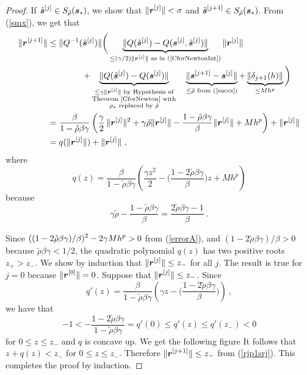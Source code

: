 \begin{proof}
 If $\displaystyle \tilde{\bm{s}}^{[j]} \in
S_{\tilde{\rho}}(\bm{s}_\ast)$, we show that
$\displaystyle \| \bm{r}^{[j]} \| < \sigma$ and
$\displaystyle \tilde{\bm{s}}^{[j+1]} \in S_{\tilde{\rho}}(\bm{s}_\ast)$.
From (\ref{smx}), we get that
\begin{align}
\| \bm{r}^{[j+1]} \| & \leq
\| Q^{-1}(\tilde{\bm{s}}^{[j]}) \|
\bigg( \underbrace{\| Q(\tilde{\bm{s}}^{[j]}) -
Q(\bm{s}^{[j]},\tilde{\bm{s}}^{[j]}) \|}_{\leq 
(\gamma/2) \| \bm{r}^{[j]}\| \text{ as in (\ref{CforNewtonInt})}}
\| \bm{r}^{[j]} \| \nonumber \\
& \qquad \qquad +
\underbrace{\| Q(\tilde{\bm{s}}^{[j]}) -Q(\bm{s}^{[j]}) \|}_{
\substack{\leq \gamma \| \bm{r}^{[j]}\| \text{ by Hypothesis of}\\
\text{Theorem~\ref{CforNewton} with}\\
\text{$\rho_\ast$ replaced by $\tilde{\rho}$}}}
\quad \underbrace{\| \bm{s}^{[j+1]} - \bm{s}^{[j]} \|}_{\leq
\tilde{\rho} \text{ from (\ref{succs})}}
+ \underbrace{\| \delta_{j+1}(h) \|}_{\leq Mh^p} \bigg)\nonumber \\
& = \frac{\beta}{1-\tilde{\rho}\beta\gamma} \left
( \frac{\gamma}{2}\,\| \bm{r}^{[j]}\|^2 + \gamma \tilde{\rho} \|
\bm{r}^{[j]} \| - \frac{1-\tilde{\rho}\beta\gamma}{\beta} \| \bm{r}^{[j]} \|
+ Mh^p \right) + \| \bm{r}^{[j]} \| \nonumber \\
&= q(\| \bm{r}^{[j]} \|) + \| \bm{r}^{[j]} \| \ ,  \label{rjp1srj}
\end{align}
where
\[
q(z) = \frac{\beta}{1-\tilde{\rho}\beta\gamma}
\left( \frac{\gamma z^2}{2} - \big
( \frac{1-2\tilde{\rho}\beta\gamma}{\beta} \big) z + Mh^p \right)
\]
because
\[
  \gamma\tilde{\rho} - \frac{1-\tilde{\rho} \beta\gamma}{\beta}
  = \frac{2\tilde{\rho}\beta\gamma -1}{\beta} \ .
\]

Since $\displaystyle ((1-2\tilde{\rho}\beta\gamma)/\beta)^2 - 2\gamma Mh^p > 0$
from (\ref{errorA}), and $(1-2\tilde{\rho}\beta\gamma)/\beta > 0$ because
$\tilde{\rho}\beta\gamma < 1/2$,  the quadratic polynomial $q(z)$ has two
positive roots $z_+ > z_-$.
We show by induction that $\displaystyle \| \bm{r}^{[j]} \| \leq z_-$
for all $j$.  The result is true for $j=0$ because
$\displaystyle \| \bm{r}^{[0]} \| = 0$.  Suppose that
$\displaystyle \| \bm{r}^{[j]}\| \leq z_-$.  Since
\[
  q'(z) = \frac{\beta}{1-\tilde{\rho}\beta\gamma} \left(
\gamma z - \big( \frac{1-2\tilde{\rho}\beta\gamma}{\beta} \big)
\right) \ ,
\]
we have that
\[
-1 < -\frac{1-2\tilde{\rho}\beta\gamma}{1-\tilde{\rho}\beta\gamma}
= q'(0) \leq q'(z) \leq q'(z_-) < 0
\]
for $0 \leq z \leq z_-$ and $q$ is concave up.  We get the following
figure
It follows that $z + q(z) < z_-$ for $0 \leq
z \leq z_-$.  Therefore $\displaystyle \| \bm{r}^{[j+1]} \| \leq z_-$ from
(\ref{rjp1srj}).  This completes the proof by induction.


\end{proof}
